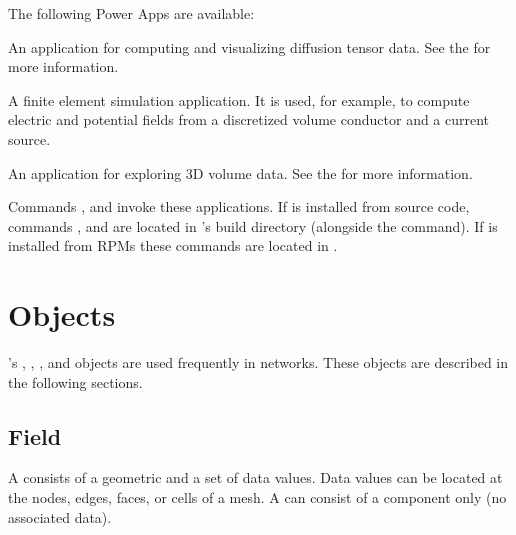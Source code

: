 The following Power Apps are available:

\begin{description}
    An application for computing
  and visualizing diffusion tensor data.  See the
  for more information.
  
    A finite element simulation
  application. It is used, for example, to compute electric and
  potential fields from a discretized volume conductor and a current
  source.

    An application for exploring 3D
  volume data.  See the 
  {}
  for more information.

\end{description}

Commands ,  and 
invoke these applications.  If \sr{} is installed from source code,
commands ,  and 
are located in \sr{}'s build directory (alongside the 
command).  If \sr{} is installed from RPMs these commands are located in
.

\section{\sr{} Objects}
\label{sec:sr-objects}

\sr{}'s , , , and
 objects are used frequently in networks.  These
objects are described in the following sections.

\subsection{Field}

A \sr{}  consists of a geometric  and a
set of data values.  Data values can be located at the nodes, edges,
faces, or cells of a mesh.  A  can consist of a
 component only (no associated data).

